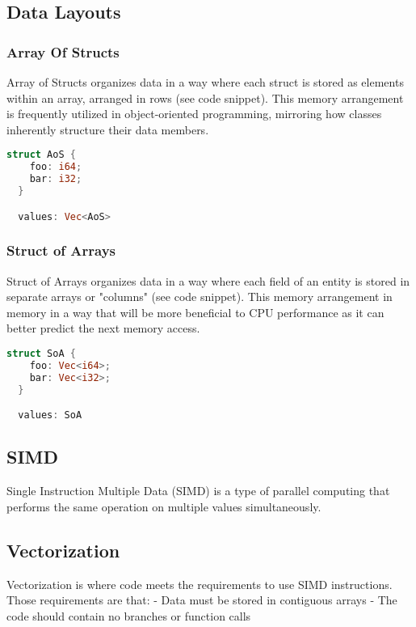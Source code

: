 \documentclass[openany, amssymb, psamsfonts]{amsart}
\theoremstyle{definition}
\numberwithin{equation}{section}
\begin{document}
\subsection{Data Layouts}

\subsubsection{Array Of Structs}

Array of Structs organizes data in a way where each struct is stored as elements within an array, arranged in rows (see code snippet). This memory arrangement is frequently utilized in object-oriented programming, mirroring how classes inherently structure their data members.\cite{Flecs} 

\begin{lstlisting}[language=Rust, style=boxed]
  struct AoS {
    foo: i64;
    bar: i32;
  }

  values: Vec<AoS>
\end{lstlisting}
 
\subsubsection{Struct of Arrays}
Struct of Arrays organizes data in a way where each field of an entity is stored in separate arrays or "columns" (see code snippet). This memory arrangement in memory in a way that will be more beneficial to CPU performance as it can better predict the next memory access.\cite{Flecs} 

\begin{lstlisting}[language=Rust, style=boxed]
  struct SoA {
    foo: Vec<i64>;
    bar: Vec<i32>;
  }

  values: SoA 
\end{lstlisting}

\subsection{SIMD}
Single Instruction Multiple Data (SIMD) is a type of parallel computing that performs the same operation on multiple values simultaneously. 

\subsection{Vectorization}
Vectorization is where code meets the requirements to use SIMD instructions. Those requirements are that:
- Data must be stored in contiguous arrays
- The code should contain no branches or function calls
\end{document}
